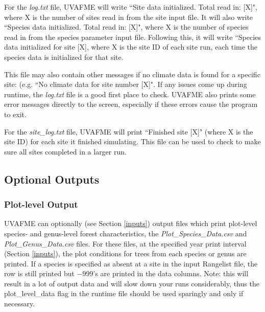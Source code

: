 \documentclass[a4paper, 12pt] {article}
\begin{document}
For the \textit{log.txt} file, UVAFME will write ``Site data initialized. Total read in: [X]", where X is the number of sites read in from the site input file. It will also write ``Species data initialized. Total read in: [X]", where X is the number of species read in from the species parameter input file. Following this, it will write ``Species data initialized for site [X], where X is the site ID of each site run, each time the species data is initialized for that site. 

This file may also contain other messages if no climate data is found for a specific site: (e.g. ``No climate data for site number [X]". If any issues come up during runtime, the \textit{log.txt} file is a good first place to check. UVAFME also prints some error messages directly to the screen, especially if these errors cause the program to exit.

For the \textit{site\_log.txt} file, UVAFME will print ``Finished site [X]" (where X is the site ID) for each site it finished simulating. This file can be used to check to make sure all sites completed in a larger run.

\subsection{Optional Outputs}

\subsubsection{Plot-level Output}

UVAFME can optionally (see Section \ref{inputs}) output files which print plot-level species- and genus-level forest characteristics, the \textit{Plot\_Species\_Data.csv} and \textit{Plot\_Genus\_Data.csv} files. For these files, at the specified year print interval (Section \ref{inputs}), the plot conditions for trees from each species or genus are printed. If a species is specified as absent at a site in the input Rangelist file, the row is still printed but $-999$'s are printed in the data columns. Note: this will result in a lot of output data and will slow down your runs considerably, thus the plot\_level\_data flag in the runtime file should be used sparingly and only if necessary.
\end{document}
